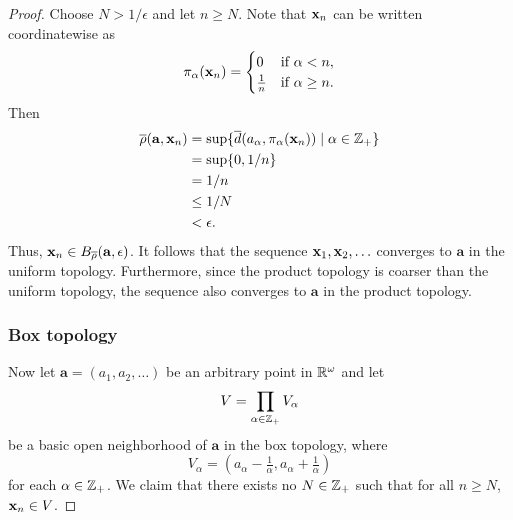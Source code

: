 \begin{solution}
\begin{proof}
        Choose $N > 1 / \epsilon$ and let $n \geq N$.
        Note that $\mathbf{x}_n$ can be written coordinatewise as
        \begin{equation*}
            \pi_\alpha(\mathbf{x}_n) = \begin{cases}
                0               & \text{if } \alpha < n, \\
                \tfrac{1}{n}    & \text{if } \alpha \geq n.
            \end{cases}
        \end{equation*}
        Then 
        \begin{align*}
          \overline{\rho}(\mathbf{a}, \mathbf{x}_n)  &= \sup\{\overline{d}(a_\alpha, \pi_\alpha(\mathbf{x}_n)) \mid \alpha \in \mathbb{Z}_+\} \\
                                              &= \sup\{0, 1/n\} \\
                                              &= 1/n \\
                                              &\leq 1/N \\
                                              &< \epsilon.
        \end{align*}
        Thus, $\mathbf{x}_n \in B_{\overline{\rho}}(\mathbf{a}, \epsilon)$.
        It follows that the sequence $\mathbf{x}_1, \mathbf{x}_2, \ldots$ converges to $\mathbf{a}$ in the uniform topology.
        Furthermore, since the product topology is coarser than the uniform topology, the sequence also converges to $\mathbf{a}$ in the product topology.

        \subsubsection*{Box topology}
        Now let $\mathbf{a} = (a_1, a_2, \ldots)$ be an arbitrary point in $\mathbb{R}^\omega$ and let
        \begin{equation*}
            V = \prod_{\alpha\in\mathbb{Z}_+} V_\alpha
        \end{equation*}
        be a basic open neighborhood of $\mathbf{a}$ in the box topology, where
        \begin{equation*}
            V_\alpha = (a_\alpha - \tfrac{1}{\alpha}, a_\alpha + \tfrac{1}{\alpha})
        \end{equation*}
        for each $\alpha \in \mathbb{Z}_+$.
        We claim that there exists no $N \in \mathbb{Z}_+$ such that for all $n \geq N$, $\mathbf{x}_n \in V$.


\end{proof}
\end{solution}
